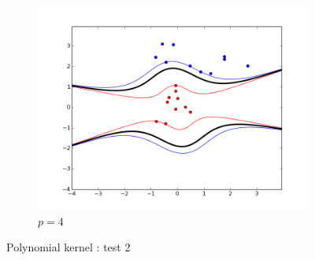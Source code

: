 \documentclass{article}
\begin{document}
\begin{figure}[!h]
\begin{subfigure}[b]{0.3\textwidth}
        \includegraphics[width=1.2\textwidth]{images/pol/2/figure_4.png}
        \caption{$p = 4$}  \label{polynomial_2_figure_3}
    \end{subfigure}
    \caption{Polynomial kernel : test 2}
    \label{polynomial_2}
\end{figure}

\newpage
\end{document}
